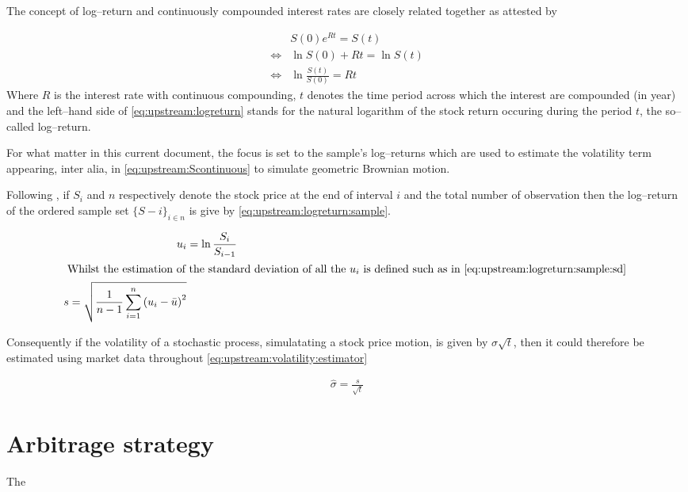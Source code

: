 \documentclass[12pt]{report}
\newcommand{\St}{S\left(t\right)}
\begin{document}
The concept of log--return and continuously compounded interest rates are closely related together as attested by 

\begin{align}
&S(0) e^{Rt} = \St \label{eq:upstream:stock:valued} \\
\Longleftrightarrow  &\ln{S(0)} + Rt = \ln{\St} \\
\Longleftrightarrow  &\ln{\frac{\St}{S(0)}} = Rt \label{eq:upstream:logreturn}
\end{align}
Where $R$ is the interest rate with continuous compounding, $t$ denotes the time period across which the interest are compounded (in year) and the left--hand side of \cref{eq:upstream:logreturn} stands for the natural logarithm of the stock return occuring during the period $t$, the so--called log--return.

For what matter in this current document, the focus is set to the sample's log--returns which are used to estimate the volatility term appearing, inter alia, in \cref{eq:upstream:Scontinuous} to simulate geometric Brownian motion.

Following \citet{hull}, if $S_i$ and $n$ respectively denote the stock price at the end of interval $i$ and the total number of observation then the log--return of the ordered sample set $\{S-i\}_{i \in n}$ is give by \cref{eq:upstream:logreturn:sample}.

\begin{align}
  u_i &= \ln \frac{S_i}{S_{i-1}} \label{eq:upstream:logreturn:sample} \\
  \intertext{
  Whilst the estimation of the standard deviation of all the $u_i$ is defined such as in \cref{eq:upstream:logreturn:sample:sd}
  }
  s = \sqrt{\frac{1}{n - 1} \sum_{i = 1}^n \left(u_i - \bar{u} \right) ^2} \label{eq:upstream:logreturn:sd} \\
\end{align}

Consequently if the volatility of a stochastic process, simulatating a stock price motion, is given by $\sigma \sqrt{t}$, then it could therefore be estimated using market data throughout \cref{eq:upstream:volatility:estimator}

\begin{align}
  \hat{\sigma} = \frac{s}{\sqrt{t}} \label{eq:upstream:volatility:estimator}
\end{align}

\section{Arbitrage strategy}
\label{sec:upstreamarbitrage}

The 











\end{document}
